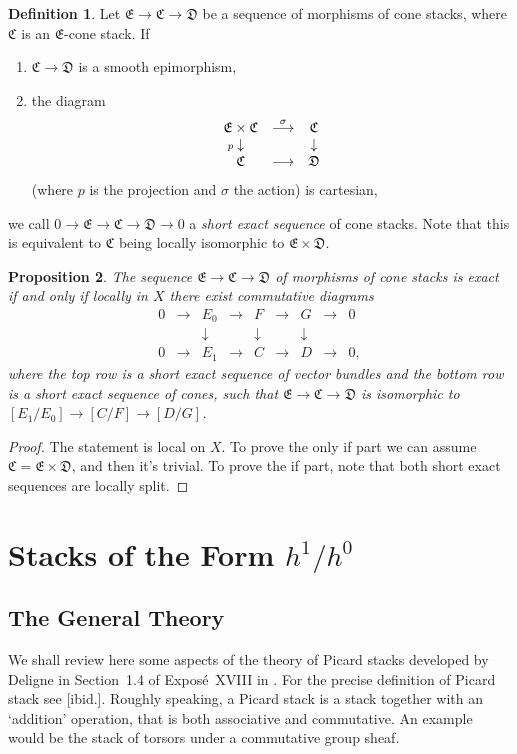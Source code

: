 \documentclass[11pt]{article}
\theoremstyle{plain}
\newtheorem{prop}{Proposition}[section]
\theoremstyle{definition}
\newtheorem{defnp}[prop]{Definition}
\newenvironment{defn}{\begin{defnp}\normalfont}{\end{defnp}}
\newenvironment{pf}{\begin{proof}}{\end{proof}}
\newcommand{\DD}{{\mathfrak{D}}}
\newcommand{\EE}{{\mathfrak{E}}}
\newcommand{\CC}{{\mathfrak{C}}}
\newcommand{\ldiag}[1]
       {\makebox[0cm]{\({\scriptstyle#1}\downarrow\phantom{\scriptstyle#1}\)}}
\newcommand{\rdiag}[1]
       {\makebox[0cm]{\(\phantom{\scriptstyle#1}\downarrow{\scriptstyle#1}\)}}
\newcommand{\comdia}[9]{
\begin{array}{ccc}
#1 & \stackrel{#2}{\longrightarrow} & #3 \\
\ldiag{#4} & #5 & \rdiag{#6} \\
#7 & \stackrel{#8}{\longrightarrow} & #9
\end{array}}
\theoremstyle{plain}
\theoremstyle{definition}
\theoremstyle{remark}
\begin{document}
\begin{defn} \label{dsescs}
Let \(\EE\to\CC\to\DD\) be a sequence of morphisms of cone stacks, where
\(\CC\) is an \(\EE\)-cone stack. If
\begin{enumerate}
\item \(\CC\to\DD\) is a smooth epimorphism,
\item the diagram
\[
\comdia{\EE\times\CC}{\sigma}{\CC}{p}{}{}{\CC}{}{\DD}
\]
(where \(p\) is the projection and \(\sigma\) the action) is cartesian,
\end{enumerate}
we call \(0\to\EE\to\CC\to\DD\to 0\) a {\em short exact sequence }of
cone stacks.  Note that this is equivalent to \(\CC\) being locally
isomorphic to \(\EE\times \DD\).\end{defn}
\begin{prop}\label{csescs}
The sequence \(\EE\to\CC\to\DD\) of morphisms of cone stacks is exact if
and only if locally in \(X\) there exist commutative diagrams
\[
\begin{array}{ccccccccc}
0 & \longrightarrow & E_0 & \longrightarrow & F & \longrightarrow & G
& \longrightarrow & 0 \\
& &\downarrow & & \downarrow  & & \downarrow & & \\
0 &\longrightarrow & E_1 & \longrightarrow & C & \longrightarrow & D &
\longrightarrow& 0,
\end{array}
\]
where the top row is a short exact sequence of vector bundles and the
bottom row is a short exact sequence of cones, such that
\(\EE\to\CC\to\DD\) is isomorphic to \([E_1/E_0]\to[C/F]\to[D/G]\).
\end{prop}
\begin{pf}
The statement is local on \(X\). To prove the only if part we can assume
\(\CC=\EE\times \DD\), and then it's trivial. To prove the if part, note
that both short exact sequences are locally split.
\end{pf}


\section{Stacks of the Form \texorpdfstring{\(h^1/h^0\)}{h1/h0}} \label{sohh}

\subsection{The General Theory}

We shall review here some aspects of the theory of Picard stacks
developed by Deligne in Section~1.4 of Expos\'e~XVIII in \cite{sga4}.
For the precise definition of Picard stack see [ibid.]. Roughly
speaking, a Picard stack is a stack together with an `addition'
operation, that is both associative and commutative. An example would
be the stack of torsors under a commutative group sheaf.
\end{document}
